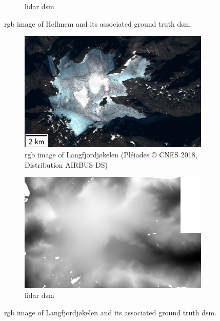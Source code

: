 \begin{figure}
\begin{subfigure}[t]{0.48\linewidth}
        \caption{\acrshort{lidar} \acrshort{dsm}}
        \label{fig:miniature_Hellmem_gt}
    \end{subfigure}
    \caption{\acrshort{rgb} image of Hellmem and its associated ground truth \acrshort{dsm}.}
    \label{fig:miniature_Hellmem}
\end{figure}

\begin{figure}
    \centering
    \begin{subfigure}[t]{0.48\linewidth}
        \flushleft
        \includegraphics[width=\linewidth]{Images/Chap_6/miniature_Langfjordjokelen.png}
        \caption{\acrshort{rgb} image of Langfjordjøkelen (Pléiades © CNES 2018, Distribution AIRBUS DS)}
        \label{fig:miniature_Langfjordjokelen_rgb}
    \end{subfigure}\hfill
    \begin{subfigure}[t]{0.48\linewidth}
        \flushright
        \includegraphics[width=\linewidth]{Images/Chap_6/miniature_Langfjordjokelen_gt.png}
        \caption{\acrshort{lidar} \acrshort{dsm}}
        \label{fig:miniature_Langfjordjokelen_gt}
    \end{subfigure}
    \caption{\acrshort{rgb} image of Langfjordjøkelen and its associated ground truth \acrshort{dsm}.}
    \label{fig:miniature_Langfjordjokelen}
\end{figure}

